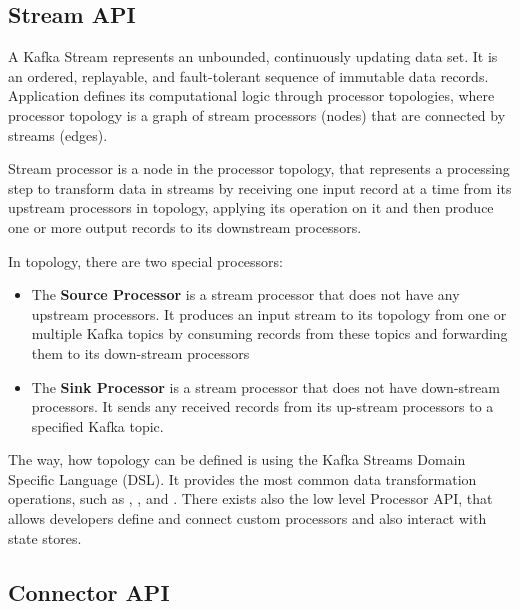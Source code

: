 


\subsection{Stream API \label{frameworks:kafka:streams}}

A Kafka Stream represents an unbounded, continuously updating data set.
It is an ordered, replayable, and fault-tolerant sequence of immutable data records.
Application defines its computational logic through processor topologies,
where processor topology is a graph of stream processors (nodes) that are
connected by streams (edges).

Stream processor is a node in the processor topology, that represents
a processing step to transform data in streams by receiving one
input record at a time from its upstream processors in topology,
applying its operation on it and then produce one or more
output records to its downstream processors.

In topology, there are two special processors:

\begin{itemize}
  \item The \textbf{Source Processor} is a stream processor
    that does not have any upstream processors. It produces an input stream
    to its topology from one or multiple Kafka topics by consuming records
    from these topics and forwarding them to its down-stream processors
  \item The \textbf{Sink Processor} is a stream processor
    that does not have down-stream processors. It sends any received records
    from its up-stream processors to a specified Kafka topic.
\end{itemize}

The way, how topology can be defined is using the Kafka Streams Domain Specific Language (DSL).
It provides the most common data transformation operations, such as
, ,  and .
There exists also the low level Processor API, that allows developers define
and connect custom processors and also interact with state stores.




\subsection{Connector API \label{frameworks:kafka:connector}}

